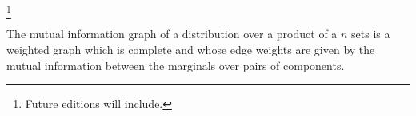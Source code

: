 
\footnote{Future editions will include.}


The mutual information graph of a distribution over a product of a $n$ sets is a weighted graph which is complete and whose edge weights are given by the mutual information between the marginals over pairs of components.

\blankpage
